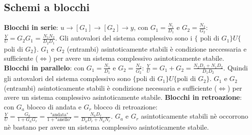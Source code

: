 \begin{landscape}
\begin{multicols*}{3}
    \section{Schemi a blocchi}
    \textbf{Blocchi in serie}: $u \rightarrow [G_1] \rightarrow  [G_2] \rightarrow y$, con $G_1 = \frac{N_1}{D_1}$ e $G_2 = \frac{N_2}{G_2}$: $\frac{Y}{U} = G_2G_1 = \frac{N_1N_2}{D_2D_1}$.\newline 
    Gli autovalori del sistema complessivo sono i $\{$ poli di $G_1\} U \{$ poli di $G_2\}$.\newline
    $G_1$ e $G_2$ (entrambi) asintoticamente stabili è condizione neccessaria e sufficiente ($\Leftrightarrow$) per avere un sistema complessivo asintoticamente stabile.\newline
    \newline
    \textbf{Blocchi in parallelo}: con $G_1 = \frac{N_1}{D_1}$ e $G_2 = \frac{N_2}{G_2}$: $\frac{Y}{U} = G_1 + G_2 = \frac{N_2D_1 + N_1 D_2}{D_1D_2}$.\newline
    Quindi gli autovalori del sistema complessivo sono $\{\text{poli di $G_1$}\} U \{\text{poli di $G_2$}\}$.\newline
    $G_1$ e $G_2$ (entrambi) asintoticamente stabili è condizione necessaria e sufficiente ($\Leftrightarrow$) per avere un sistema complessivo asintoticamente stabile.\newline
    \newline
    \textbf{Blocchi in retroazione}: con $G_a$ blocco di andata e $G_r$ blocco di retroazione: $\frac{Y}{U} = \frac{G_a}{1 + G_aG_r} = \frac{\text{"andata"}}{1+ \text{"anello"}} = \frac{N_aD_r}{D_aD_r +N_aN_r}$. \newline
    $G_a$ e $G_r$ asintoticamente stabili nè occorrono nè bastano per avere un sistema complessivo asintoticamente stabile.

\end{multicols*}
\end{landscape}
